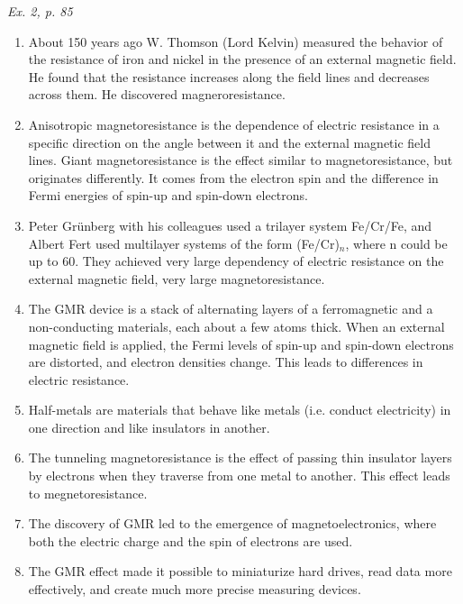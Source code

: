 \documentclass[a4paper, 12pt]{article}
\def\task#1{\begin{center}\it #1\end{center}}
\newif\ifcols
\begin{document}
\task{Ex. 2, p. 85}
\ifcols\begin{multicols}{2}\fi%
	\begin{enumerate}[label=\alph*)]
		\item About 150 years ago W. Thomson (Lord Kelvin) measured 
			the behavior of the resistance of iron and nickel in the 
			presence of an external magnetic field. He found that the 
			resistance increases along the field lines and decreases 
			across them. He discovered magneroresistance.

		\item Anisotropic magnetoresistance is the dependence of 
			electric resistance in a specific direction on the angle 
			between it and the external magnetic field lines. Giant 
			magnetoresistance is the effect similar to 
			magnetoresistance, but originates differently. It comes from 
			the electron spin and the difference in Fermi energies of 
			spin-up and spin-down electrons.

		\item Peter Gr\"{u}nberg with his colleagues used a trilayer 
			system Fe/Cr/Fe, and Albert Fert used multilayer systems of 
			the form (Fe/Cr)$_n$, where n could be up to 60. They 
			achieved very large dependency of electric resistance on the 
			external magnetic field, very large magnetoresistance.

		\item The GMR device is a stack of alternating layers of 
			a ferromagnetic and a non-conducting materials, each about 
			a few atoms thick. When an external magnetic field is 
			applied, the Fermi levels of spin-up and spin-down electrons 
			are distorted, and electron densities change. This leads to 
			differences in electric resistance.

		\item Half-metals are materials that behave like metals (i.e. 
			conduct electricity) in one direction and like insulators in 
			another.

		\item The tunneling magnetoresistance is the effect of passing 
			thin insulator layers by electrons when they traverse from 
			one metal to another. This effect leads to 
			megnetoresistance.

		\item The discovery of GMR led to the emergence of 
			magnetoelectronics, where both the electric charge and the 
			spin of electrons are used.

		\item The GMR effect made it possible to miniaturize hard 
			drives, read data more effectively, and create much more 
			precise measuring devices.
	\end{enumerate}
\ifcols\end{multicols}\fi%
\end{document}
